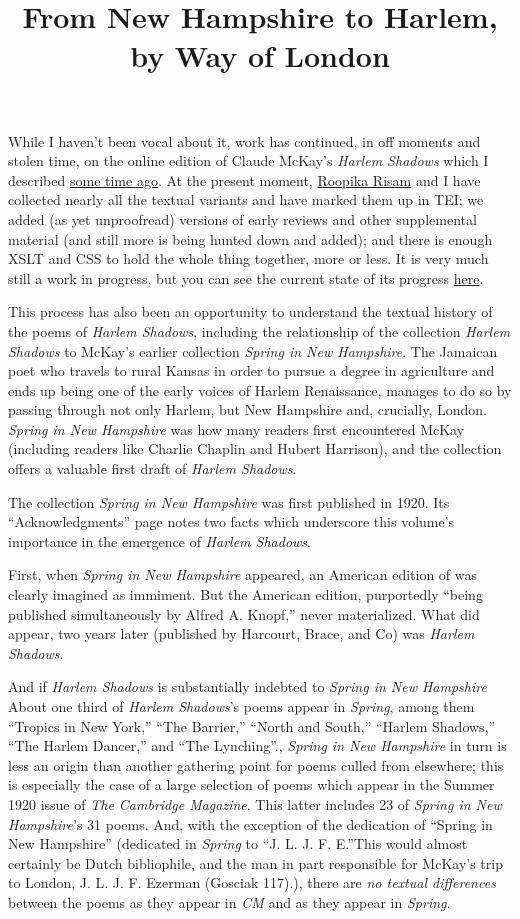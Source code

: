 \documentclass[
  12pt,
]{article}
\title{From New Hampshire to Harlem, by Way of London}
\author{}
\date{}
\begin{document}
While I haven't been vocal about it, work has continued, in off moments
and stolen time, on the online edition of Claude McKay's \emph{Harlem
Shadows} which I described \href{/2012/06/drill-baby-drill/}{some time
ago}. At the present moment, \href{http://roopikarisam.com/}{Roopika
Risam} and I have collected nearly all the textual variants and have
marked them up in TEI; we added (as yet unproofread) versions of early
reviews and other supplemental material (and still more is being hunted
down and added); and there is enough XSLT and CSS to hold the whole
thing together, more or less. It is very much still a work in progress,
but you can see the current state of its progress
\href{http://harlemshadows.org/beta/}{here}.

This process has also been an opportunity to understand the textual
history of the poems of \emph{Harlem Shadows}, including the
relationship of the collection \emph{Harlem Shadows} to McKay's earlier
collection \emph{Spring in New Hampshire}. The Jamaican poet who travels
to rural Kansas in order to pursue a degree in agriculture and ends up
being one of the early voices of Harlem Renaissance, manages to do so by
passing through not only Harlem, but New Hampshire and, crucially,
London. \emph{Spring in New Hampshire} was how many readers first
encountered McKay (including readers like Charlie Chaplin and Hubert
Harrison), and the collection offers a valuable first draft of
\emph{Harlem Shadows}.

The collection \emph{Spring in New Hampshire} was first published in
1920. Its ``Acknowledgments'' page notes two facts which underscore this
volume's importance in the emergence of \emph{Harlem Shadows}.

First, when \emph{Spring in New Hampshire} appeared, an American edition
of was clearly imagined as immiment. But the American edition,
purportedly ``being published simultaneously by Alfred A. Knopf,'' never
materialized. What did appear, two years later (published by Harcourt,
Brace, and Co) was \emph{Harlem Shadows}.

And if \emph{Harlem Shadows} is substantially indebted to \emph{Spring
in New Hampshire} {About one third of \emph{Harlem Shadows}'s poems
appear in \emph{Spring}, among them ``Tropics in New York,'' ``The
Barrier,'' ``North and South,'' ``Harlem Shadows,'' ``The Harlem
Dancer,'' and ``The Lynching''.}, \emph{Spring in New Hampshire} in turn
is less an origin than another gathering point for poems culled from
elsewhere; this is especially the case of a large selection of poems
which appear in the Summer 1920 issue of \emph{The Cambridge Magazine}.
This latter includes 23 of \emph{Spring in New Hampshire}'s 31 poems.
And, with the exception of the dedication of ``Spring in New Hampshire''
(dedicated in \emph{Spring} to ``J. L. J. F. E.''{This would almost
certainly be Dutch bibliophile, and the man in part responsible for
McKay's trip to London, J. L. J. F. Ezerman (Gosciak 117).}), there are
\emph{no textual differences} between the poems as they appear in
\emph{CM} and as they appear in \emph{Spring}.
\end{document}
